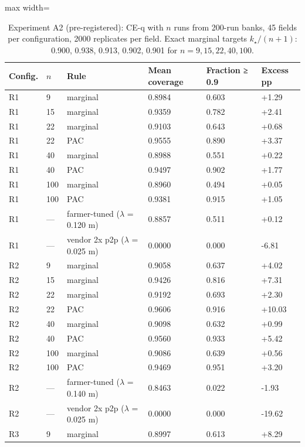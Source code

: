 \documentclass[preprint,12pt,authoryear]{elsarticle}
\begin{document}
\begin{table}[!htbp]
\centering
\footnotesize
\renewcommand{\thetable}{S24}\caption{Experiment A2 (pre-registered): CE-q with \(n\) runs from 200-run banks, 45 fields per configuration, 2000 replicates per field. Exact marginal targets \(k_\star/(n+1)\): 0.900, 0.938, 0.913, 0.902, 0.901 for \(n=9,15,22,40,100\).}
\begin{adjustbox}{max width=\textwidth}
\begin{tabular}{@{}ll>{\raggedright\arraybackslash}p{15.6em}lll@{}}
\toprule
\textbf{Config.} & \textbf{\(n\)} & \textbf{Rule} & \textbf{Mean coverage} & \textbf{Fraction ≥ 0.9} & \textbf{Excess pp} \\
\midrule
R1 & 9 & marginal & 0.8984 & 0.603 & +1.29 \\
R1 & 15 & marginal & 0.9359 & 0.782 & +2.41 \\
R1 & 22 & marginal & 0.9103 & 0.643 & +0.68 \\
R1 & 22 & PAC & 0.9555 & 0.890 & +3.37 \\
R1 & 40 & marginal & 0.8988 & 0.551 & +0.22 \\
R1 & 40 & PAC & 0.9497 & 0.902 & +1.77 \\
R1 & 100 & marginal & 0.8960 & 0.494 & +0.05 \\
R1 & 100 & PAC & 0.9381 & 0.915 & +1.05 \\
R1 & --- & farmer-tuned (\(\lambda\) = 0.120 m) & 0.8857 & 0.511 & +0.12 \\
R1 & --- & vendor 2x p2p (\(\lambda\) = 0.025 m) & 0.0000 & 0.000 & -6.81 \\
R2 & 9 & marginal & 0.9058 & 0.637 & +4.02 \\
R2 & 15 & marginal & 0.9426 & 0.816 & +7.31 \\
R2 & 22 & marginal & 0.9192 & 0.693 & +2.30 \\
R2 & 22 & PAC & 0.9606 & 0.916 & +10.03 \\
R2 & 40 & marginal & 0.9098 & 0.632 & +0.99 \\
R2 & 40 & PAC & 0.9560 & 0.933 & +5.42 \\
R2 & 100 & marginal & 0.9086 & 0.639 & +0.56 \\
R2 & 100 & PAC & 0.9469 & 0.951 & +3.20 \\
R2 & --- & farmer-tuned (\(\lambda\) = 0.140 m) & 0.8463 & 0.022 & -1.93 \\
R2 & --- & vendor 2x p2p (\(\lambda\) = 0.025 m) & 0.0000 & 0.000 & -19.62 \\
R3 & 9 & marginal & 0.8997 & 0.613 & +8.29 \\

\end{tabular}
\end{adjustbox}
\end{table}
\end{document}
